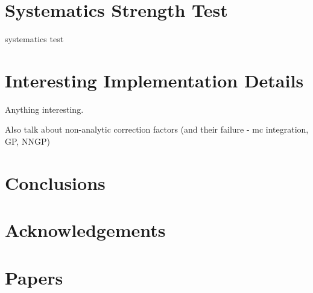 \documentclass[a4paper,fleqn,usenatbib]{mnras}
\begin{document}
\section{Systematics Strength Test}
\label{sec:sys}

systematics test

\section{Interesting Implementation Details}
\label{sec:details}
Anything interesting.

Also talk about non-analytic correction factors (and their failure - mc integration, GP, NNGP)



\section{Conclusions}



\section*{Acknowledgements}














\appendix

\section{Papers}






\bsp	%
\label{lastpage}
\end{document}
